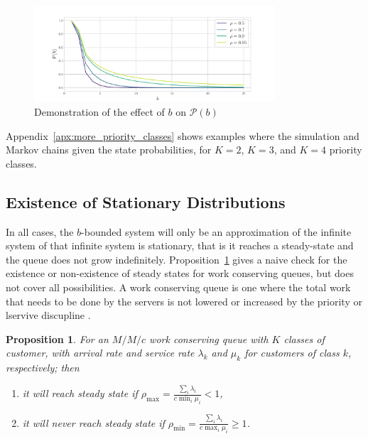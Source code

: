 \documentclass{article}
\newtheorem{prop}{Proposition}
\begin{document}
\begin{figure}
  \begin{center}
    \includegraphics[width=0.8\textwidth]{img/hitting_accuracy.pdf}
  \end{center}
  \caption{Demonstration of the effect of $b$ on $\mathcal{P}(b)$}
  \label{fig:hitting_accuracy}
\end{figure}

Appendix~\ref{apx:more_priority_classes} shows examples where the simulation and
Markov chains given the state probabilities, for $K = 2$, $K = 3$, and $K = 4$
priority classes.

\subsection{Existence of Stationary Distributions}\label{sec:stationary}
In all cases, the $b$-bounded system will only be an approximation of the
infinite system of that infinite system is stationary, that is it reaches a
steady-state and the queue does not grow indefinitely.
Proposition~\ref{thrm:steadystate} gives a naive check for the existence or
non-existence of steady states for work conserving queues, but does not cover
all possibilities. A work conserving queue is one where the total work that
needs to be done by the servers is not lowered or increased by the priority or
lservive discupline \cite{wolff70}.

\begin{prop}\label{thrm:steadystate}
For an $M/M/c$ work conserving queue with $K$ classes of customer, with arrival
rate and service rate $\lambda_k$ and  $\mu_k$ for customers of class $k$,
respectively; then
\begin{enumerate}
  \item it will reach steady state if
  $\rho_{\max} = \frac{\sum_i \lambda_i}{c \min_i \mu_i} < 1$,
  \item it will never reach steady state if
  $\rho_{\min} = \frac{\sum_i \lambda_i}{c \max_i \mu_i} \geq 1$.
\end{enumerate}
\end{prop}
\end{document}

